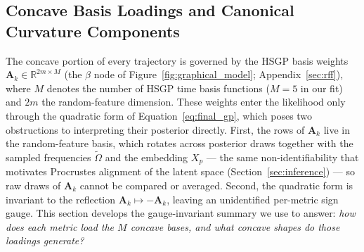 
\fi

\subsection{Concave Basis Loadings and Canonical Curvature Components}
\label{sec:concave_loadings}

The concave portion of every trajectory is governed by the HSGP basis weights $\mathbf{A}_k \in \mathbb{R}^{2m \times M}$ (the $\beta$ node of Figure~\ref{fig:graphical_model}; Appendix~\ref{sec:rff}), where $M$ denotes the number of HSGP time basis functions ($M = 5$ in our fit) and $2m$ the random-feature dimension.  These weights enter the likelihood only through the quadratic form of Equation~\ref{eq:final_gp}, which poses two obstructions to interpreting their posterior directly.  First, the rows of $\mathbf{A}_k$ live in the random-feature basis, which rotates across posterior draws together with the sampled frequencies $\tilde\Omega$ and the embedding $X_p$ --- the same non-identifiability that motivates Procrustes alignment of the latent space (Section~\ref{sec:inference}) --- so raw draws of $\mathbf{A}_k$ cannot be compared or averaged.  Second, the quadratic form is invariant to the reflection $\mathbf{A}_k \mapsto -\mathbf{A}_k$, leaving an unidentified per-metric sign gauge.  This section develops the gauge-invariant summary we use to answer: \emph{how does each metric load the $M$ concave bases, and what concave shapes do those loadings generate?}

